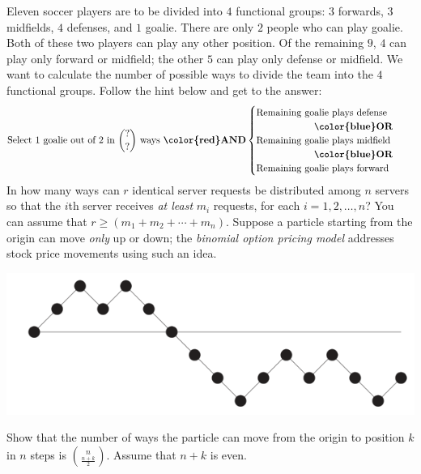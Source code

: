 \documentclass[12pt,addpoints,answers]{exam}
\begin{document}
\begin{questions}
\question Eleven soccer players are to be divided into $4$ functional groups: $3$ forwards, $3$ midfields, $4$ defenses, and $1$ goalie. There are only $2$ people who can play goalie. Both of these two players can play any other position. Of the remaining $9$, $4$ can play only forward or midfield; the other $5$ can play only defense or midfield. We want to calculate the number of possible ways to divide the team into the $4$ functional groups. Follow the hint below and get to the answer:
\begin{align*}
\text{Select 1 goalie out of 2 in } \binom{?}{?}\text{ ways \textbf{\color{red}AND}} &\begin{cases}\text{Remaining goalie plays defense}\\\qquad\qquad\qquad\textbf{\color{blue}OR}\\\text{Remaining goalie plays midfield}\\\qquad\qquad\qquad\textbf{\color{blue}OR}\\\text{Remaining goalie plays forward}\end{cases}
\end{align*}
\question In how many ways can $r$ identical server requests be distributed among $n$ servers so that the $i$th server receives \emph{at least} $m_i$ requests, for each $i = 1,2,\ldots,n$? You can assume that $r \geq (m_1+m_2+\cdots+m_n).$
\question Suppose a particle starting from the origin can move \emph{only} up or down; the \emph{binomial option pricing model} addresses stock price movements using such an idea. 
\begin{center}
\includegraphics[keepaspectratio, scale = 0.7]{binomialmove.png}
\end{center}
Show that the number of ways the particle can move from the origin to position $k$ in $n$ steps is $\binom{n}{\frac{n+k}{2}}.$ Assume that $n+k$ is even.
\end{questions}
\label{totalpag}
\end{document}
